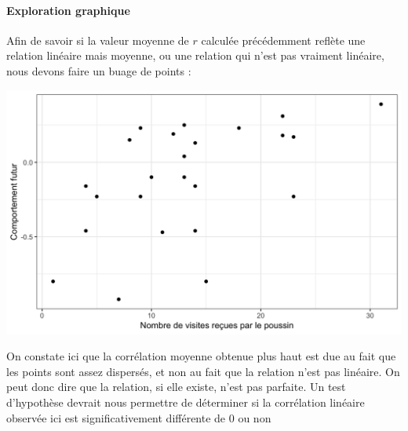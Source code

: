\documentclass[a4paperpaper,]{article}
\newenvironment{Shaded}{\begin{snugshade}}{\end{snugshade}}
\newcommand{\DataTypeTok}[1]{\textcolor[rgb]{0.00,0.34,0.68}{#1}}
\newcommand{\KeywordTok}[1]{\textcolor[rgb]{0.12,0.11,0.11}{\textbf{#1}}}
\newcommand{\NormalTok}[1]{\textcolor[rgb]{0.12,0.11,0.11}{#1}}
\newcommand{\OperatorTok}[1]{\textcolor[rgb]{0.12,0.11,0.11}{#1}}
\newcommand{\StringTok}[1]{\textcolor[rgb]{0.75,0.01,0.01}{#1}}
\let\oldparagraph\paragraph
\renewcommand{\paragraph}[1]{\oldparagraph{#1}\mbox{}}
\begin{document}
\hypertarget{exploration-graphique-4}{%
\paragraph{Exploration graphique}\label{exploration-graphique-4}}

Afin de savoir si la valeur moyenne de \(r\) calculée précédemment reflète une relation linéaire mais moyenne, ou une relation qui n'est pas vraiment linéaire, nous devons faire un buage de points :

\begin{Shaded}
\end{Shaded}

\begin{center}\includegraphics[width=0.9\linewidth]{figure/unnamed-chunk-103-1} \end{center}

On constate ici que la corrélation moyenne obtenue plus haut est due au fait que les points sont assez dispersés, et non au fait que la relation n'est pas linéaire. On peut donc dire que la relation, si elle existe, n'est pas parfaite. Un test d'hypothèse devrait nous permettre de déterminer si la corrélation linéaire observée ici est significativement différente de 0 ou non
\end{document}
